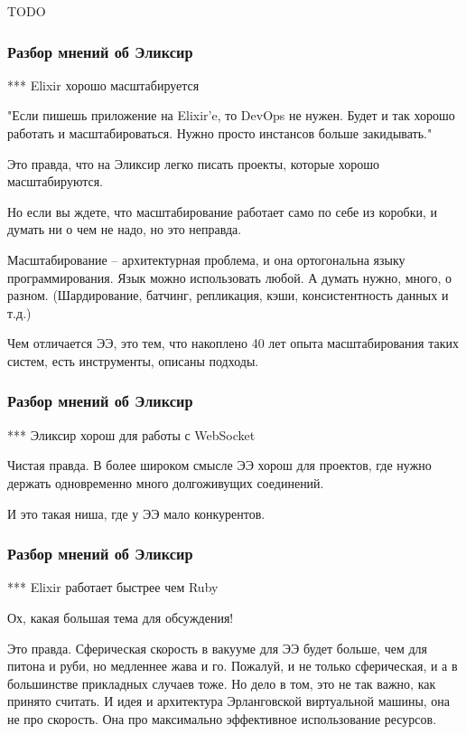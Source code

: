 \documentclass[10pt]{beamer}
\begin{document}

\iffalse TODO


\begin{frame}
\frametitle{Разбор мнений об Эликсир}
\centering
\par \bigskip
\end{frame}

*** Elixir хорошо масштабируется

"Если пишешь приложение на Elixir'e, то DevOps не нужен. Будет и так хорошо работать и масштабироваться. Нужно просто инстансов больше закидывать."

Это правда, что на Эликсир легко писать проекты, которые хорошо масштабируются.

Но если вы ждете, что масштабирование работает само по себе из коробки, и думать ни о чем не надо, но это неправда.

Масштабирование -- архитектурная проблема, и она ортогональна языку программирования. Язык можно использовать любой. А думать нужно, много, о разном.
(Шардирование, батчинг, репликация, кэши, консистентность данных и т.д.)

Чем отличается ЭЭ, это тем, что накоплено 40 лет опыта масштабирования таких систем, есть инструменты, описаны подходы.

\begin{frame}
\frametitle{Разбор мнений об Эликсир}
\centering
\par \bigskip
\end{frame}

*** Эликсир хорош для работы с WebSocket

Чистая правда. В более широком смысле ЭЭ хорош для проектов, где нужно держать одновременно много долгоживущих соединений.

И это такая ниша, где у ЭЭ мало конкурентов.

\begin{frame}
\frametitle{Разбор мнений об Эликсир}
\centering
\par \bigskip
\end{frame}

*** Elixir работает быстрее чем Ruby

Ох, какая большая тема для обсуждения!

Это правда. Сферическая скорость в вакууме для ЭЭ будет больше, чем для питона и руби, но медленнее жава и го.
Пожалуй, и не только сферическая, и а в большинстве прикладных случаев тоже.
Но дело в том, это не так важно, как принято считать.
И идея и архитектура Эрланговской виртуальной машины, она не про скорость. Она про максимально эффективное использование ресурсов.
\end{document}
